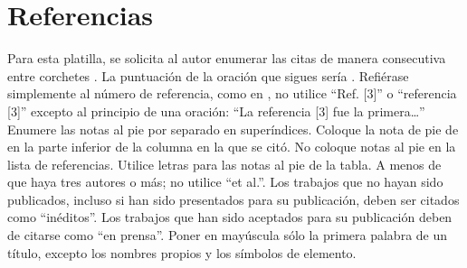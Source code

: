     \section*{Referencias}
    
    Para esta platilla, se solicita al autor enumerar las citas de manera consecutiva entre corchetes . 
    La puntuación de la oración que sigues sería . 
    Refiérase simplemente al número de referencia, como en , no utilice “Ref. [3]” o “referencia [3]” excepto al principio de una oración: “La referencia [3] fue la primera…”
    Enumere las notas al pie por separado en superíndices. Coloque la nota de pie de en la parte inferior de la columna en la que se citó. No coloque notas al pie en la lista de referencias. Utilice letras para las notas al pie de la tabla.
    A menos de que haya tres autores o más; no utilice “et al.”. Los trabajos que no hayan sido publicados, incluso si han sido presentados para su publicación, deben ser citados como “inéditos”. Los trabajos que han sido aceptados para su publicación deben de citarse como “en prensa”. Poner en mayúscula sólo la primera palabra de un título, excepto los nombres propios y los símbolos de elemento. 
    
    
    
    
    
    
